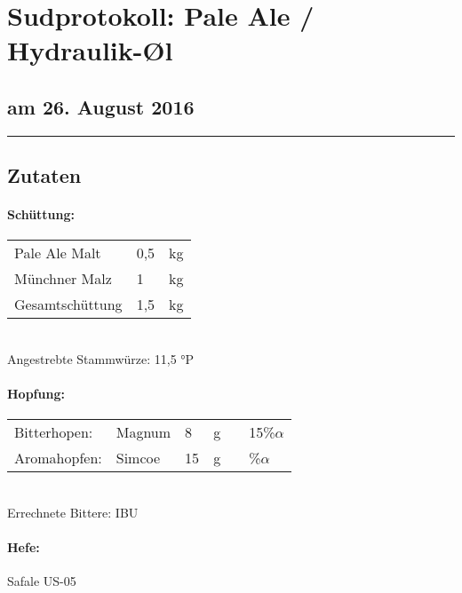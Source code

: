 \documentclass[12pt,oneside,a4paper]{scrartcl}
\begin{document}
	\begin{minipage}[c]{0.70\textwidth}
		\section*{\hspace{-.4cm}Sudprotokoll: Pale Ale / Hydraulik-\O{}l}
	\end{minipage}
	\begin{minipage}[c]{0.29\textwidth}
		\subsection*{am 26. August 2016}
	\end{minipage}
	\rule{\textwidth}{1pt}
%
\subsection*{Zutaten}
%
\paragraph{Schüttung:}
	\begin{tabular}[t]{m{8cm} m{2cm} m{1cm}}
		Pale Ale Malt & 0,5 & kg \bigstrut\\
		Münchner Malz & 1 & kg \bigstrut\\\hline
		Gesamtschüttung & 1,5 & kg\bigstrut
	\end{tabular}\\

\vspace{.25cm}
\hspace{1cm}Angestrebte Stammwürze: 11,5 °P
%
\paragraph{Hopfung:}
	\begin{tabular}[t]{m{2.5cm} m{5cm} m{0.5cm} m{1cm} m{0.5cm} m{1cm}}
		Bitterhopen: & Magnum & 8 & g &  & 15\%$\alpha$ \\
		Aromahopfen: & Simcoe & 15 & g &  &\%$\alpha$
	\end{tabular}\\

\vspace{.25cm}
\hspace{1cm}Errechnete Bittere:  IBU
%
\paragraph{Hefe:}
	Safale US-05
\end{document}
